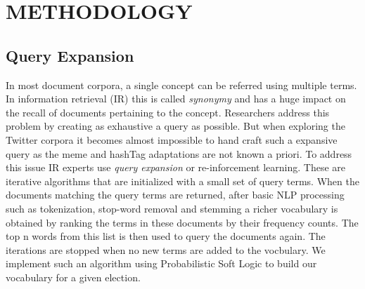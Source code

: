 \section{METHODOLOGY}
\subsection{Query Expansion}
In most document corpora, a single concept can be referred using multiple terms.
In information retrieval (IR) this is called \emph{synonymy} and has a huge impact on the recall of documents pertaining to the concept.
Researchers address this problem by creating as exhaustive a query as possible. 
But when exploring the Twitter corpora it becomes almost impossible to hand craft such a expansive query as the meme and hashTag adaptations are not known a priori. 
\newline
To address this issue IR experts use \emph{query expansion} or re-inforcement learning.
These are iterative algorithms that are initialized with a small set of query terms. 
When the documents matching the query terms are returned, after basic NLP processing such as tokenization, stop-word removal and stemming a richer vocabulary is obtained by ranking the terms in these documents by their frequency counts.
The top n words from this list is then used to query the documents again. 
The iterations are stopped when no new terms are added to the vocbulary. 
We implement such an algorithm using Probabilistic Soft Logic to build our vocabulary for a given election. 
